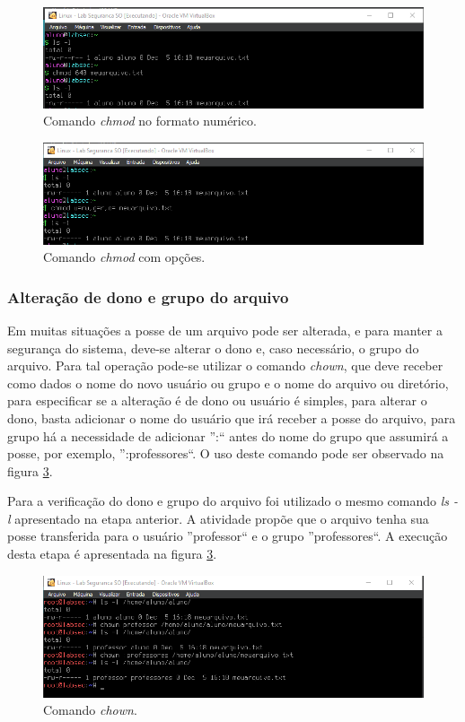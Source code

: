 \documentclass[
  12pt,				%
  oneside,   	        %
  a4paper,			%
  english,			%
  french,				%
  spanish,			%
  brazil,				%
  ]{pacotes/abntex2}
\begin{document}
\begin{figure}[H]
  \centering
  \includegraphics[scale=0.7]{figuras/chmod_num.png}
  \caption{Comando \textit{chmod} no formato numérico.}
  \label{fig:chmod_num}
\end{figure}

\begin{figure}[H]
  \centering
  \includegraphics[scale=0.7]{figuras/chmod_ugoa.png}
  \caption{Comando \textit{chmod} com opções.}
  \label{fig:chmod_ugoa}
\end{figure}

\subsubsection{Alteração de dono e grupo do arquivo}
Em muitas situações a posse de um arquivo pode ser alterada, e para manter a segurança do sistema, deve-se alterar o dono e, caso necessário, o grupo do arquivo. Para tal operação pode-se utilizar o comando \textit{chown}, que deve receber como dados o nome do novo usuário ou grupo e o nome do arquivo ou diretório, para especificar se a alteração é de dono ou usuário é simples, para alterar o dono, basta adicionar o nome do usuário que irá receber a posse do arquivo, para grupo há a necessidade de adicionar '':`` antes do nome do grupo que assumirá a posse, por exemplo, '':professores``. O uso deste comando pode ser observado na figura \ref{fig:chown}.

Para a verificação do dono e grupo do arquivo foi utilizado o mesmo comando \textit{ls -l} apresentado na etapa anterior. A atividade propõe que o arquivo tenha sua posse transferida para o usuário ''professor`` e o grupo ''professores``. A execução desta etapa é apresentada na figura \ref{fig:chown}.
\begin{figure}[H]
  \centering
  \includegraphics[scale=0.7]{figuras/chown.png}
  \caption{Comando \textit{chown}.}
  \label{fig:chown}
\end{figure}
\end{document}
